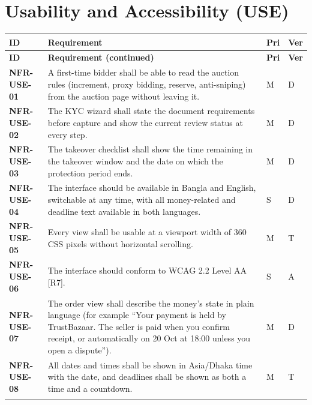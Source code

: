 \documentclass[11pt,a4paper]{report}
\makeatletter
\newenvironment{reqs}{%
  \small
  \begin{longtable}{@{}>{\raggedright\arraybackslash}p{2.35cm}
                       >{\raggedright\arraybackslash}p{10.3cm}
                       >{\centering\arraybackslash}p{0.7cm}
                       >{\centering\arraybackslash}p{0.7cm}@{}}
  \toprule
  \textbf{ID} & \textbf{Requirement} & \textbf{Pri} & \textbf{Ver} \\
  \midrule
  \endfirsthead
  \toprule
  \textbf{ID} & \textbf{Requirement (continued)} & \textbf{Pri} & \textbf{Ver} \\
  \midrule
  \endhead
  \bottomrule
  \endfoot
}{\end{longtable}}
\newcommand{\req}[5]{\leavevmode\textbf{#1}\hypertarget{#1}{} & #5 & #2 & #3 \\ \addlinespace[2pt]}
\makeatother
\begin{document}
\section{Usability and Accessibility (USE)}
\begin{reqs}
\req{NFR-USE-01}{M}{D}{NFR-12}{A first-time bidder shall be able to read the auction rules (increment, proxy bidding, reserve, anti-sniping) from the auction page without leaving it.}
\req{NFR-USE-02}{M}{D}{NFR-13}{The KYC wizard shall state the document requirements before capture and show the current review status at every step.}
\req{NFR-USE-03}{M}{D}{NFR-23}{The takeover checklist shall show the time remaining in the takeover window and the date on which the protection period ends.}
\req{NFR-USE-04}{S}{D}{new}{The interface should be available in Bangla and English, switchable at any time, with all money-related and deadline text available in both languages.}
\req{NFR-USE-05}{M}{T}{new}{Every view shall be usable at a viewport width of 360 CSS pixels without horizontal scrolling.}
\req{NFR-USE-06}{S}{A}{new}{The interface should conform to WCAG 2.2 Level AA [R7].}
\req{NFR-USE-07}{M}{D}{new}{The order view shall describe the money's state in plain language (for example ``Your payment is held by TrustBazaar. The seller is paid when you confirm receipt, or automatically on 20 Oct at 18:00 unless you open a dispute'').}
\req{NFR-USE-08}{M}{T}{new}{All dates and times shall be shown in Asia/Dhaka time with the date, and deadlines shall be shown as both a time and a countdown.}
\end{reqs}
\end{document}
